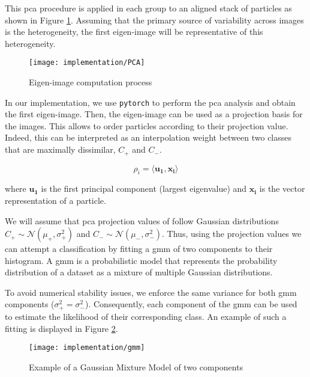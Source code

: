 \documentclass[../main.tex]{subfiles}
\begin{document}
This \gls{pca} procedure is applied in each group to an aligned stack of particles as shown in Figure \ref{fig:4.1:eigenimage}. Assuming that the primary source of variability across images is the heterogeneity, the first eigen-image will be representative of this heterogeneity.

\begin{figure}[hbp]
    \centering
    \texttt{[image: implementation/PCA]}
    \caption{Eigen-image computation process}
    \label{fig:4.1:eigenimage}
\end{figure}

In our implementation, we use \texttt{pytorch}\cite{paszke2019} to perform the \gls{pca} analysis and obtain the first eigen-image. Then, the eigen-image can be used as a projection basis for the images. This allows to order particles according to their projection value. Indeed, this can be interpreted as an interpolation weight between two classes that are maximally dissimilar, $C_+$ and $C_-$.

\begin{equation}\label{eq:4.1:pca_projection}
    \rho_i = \langle \bm{u_1}, \bm{x_i} \rangle
\end{equation}

where $\bm{u_1}$ is the first principal component (largest eigenvalue) and $\bm{x_i}$ is the vector representation of a particle.

We will assume that \gls{pca} projection values of follow Gaussian distributions $C_+ \sim \mathcal{N}(\mu_+, \sigma_+^2)$ and $C_- \sim \mathcal{N}(\mu_-, \sigma_-^2)$. Thus, using the projection values we can attempt a classification by fitting a \gls{gmm} of two components to their histogram. A \gls{gmm} is a probabilistic model that represents the probability distribution of a dataset as a mixture of multiple Gaussian distributions.

To avoid numerical stability issues, we enforce the same variance for both \gls{gmm} components ($\sigma_+^2 = \sigma_-^2$). Consequently, each component of the \gls{gmm} can be used to estimate the likelihood of their corresponding class. An example of such a fitting is displayed in Figure \ref{fig:4.1:gmm}.

\begin{figure}[hbp]
    \centering
    \texttt{[image: implementation/gmm]}
    \caption{Example of a Gaussian Mixture Model of two components}
    \label{fig:4.1:gmm}
\end{figure}
\end{document}
